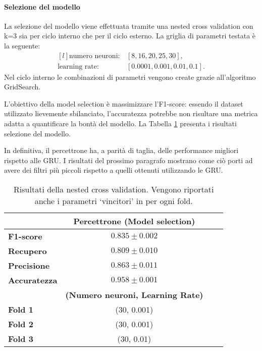 \documentclass[../../main.tex]{subfiles}
\begin{document}
    \paragraph{Selezione del modello}

    La selezione del modello viene effettuata tramite una nested cross validation con k=3 sia per ciclo interno che per il ciclo esterno. La griglia di parametri testata è la seguente:
    \[
    \begin{matrix*}[l]
        \text{numero neuroni}: & [8, 16, 20, 25, 30],\\
        \text{learning rate}: & [0.0001, 0.001, 0.01, 0.1].
    \end{matrix*}
    \]
    Nel ciclo interno le combinazioni di parametri vengono create grazie all'algoritmo GridSearch.

    L'obiettivo della model selection è massimizzare l'F1-score: essendo il dataset utilizzato lievemente sbilanciato, l'accuratezza potrebbe non risultare una metrica adatta a quantificare la bontà del modello. La Tabella \ref{tab:modelSelection} presenta i risultati selezione del modello.
    
    In definitiva, il percettrone ha, a parità di taglia, delle performance migliori rispetto alle GRU. I risultati del prossimo paragrafo mostrano come ciò porti ad avere dei filtri più piccoli rispetto a quelli ottenuti utilizzando le GRU.
    \begin{table}[H]
        \centering                  
        \begin{tabular}{lccc}
            \toprule
            {}  &   \textbf{Percettrone (Model selection)}\\
            \midrule
            \textbf{F1-score }      &    $0.835 \pm 0.002$ \\
            \textbf{Recupero   }    &    $0.809 \pm 0.010$ \\
            \textbf{Precisione }    &    $0.863 \pm 0.011$ \\
            \textbf{Accuratezza }   &    $0.958 \pm 0.001$ \\
            \midrule
            {} & \textbf{(Numero neuroni, Learning Rate)}\\
            \midrule
            \textbf{Fold 1} &   (30, 0.001)\\ 
            \textbf{Fold 2} &   (30, 0.001)\\
            \textbf{Fold 3} &   (30, 0.01)\\
            \bottomrule
        \end{tabular}
        \caption{Risultati della nested cross validation. Vengono riportati anche i parametri `vincitori' in per ogni fold.}
        \label{tab:modelSelection}
    \end{table}
\end{document}
